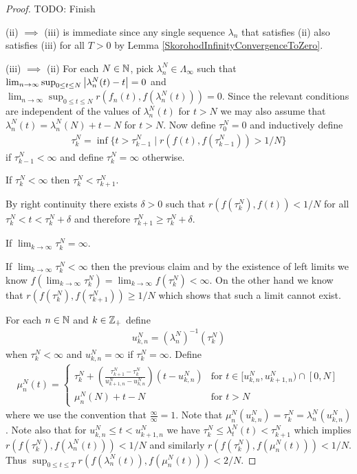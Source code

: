 \begin{proof}
TODO: Finish

(ii) $\implies$ (iii) is immediate since any single sequence $\lambda_n$ that satisfies (ii) also satisfies (iii) for all $T > 0$ by Lemma \ref{SkorohodInfinityConvergenceToZero}.

(iii) $\implies$ (ii)  For each $N \in \mathbb{N}$, pick $\lambda^N_n \in \Lambda_\infty$ such that $\lim_{n \to \infty} \sup_{0 \leq t \leq N} \left \vert \lambda^N_n(t) - t \right \vert = 0$ and $\lim_{n \to \infty} \sup_{0 \leq t \leq N} r(f_n(t), f(\lambda^N_n(t))) = 0$.  Since the relevant conditions are independent of the values of $\lambda^N_n(t)$ for $t > N$ we may also assume that
$\lambda^N_n(t) = \lambda^N_n(N) + t - N$ for $t > N$.  Now define $\tau^N_0 = 0$ and inductively define
\begin{align*}
\tau^N_k = \inf \lbrace t > \tau^N_{k-1} \mid r(f(t), f(\tau^N_{k-1})) > 1/N \rbrace
\end{align*}
if $\tau^N_{k-1} < \infty$ and define $\tau^N_k = \infty$ otherwise.

\begin{clm}If $\tau^N_k < \infty$ then $\tau^N_k < \tau^N_{k+1}$.
\end{clm}
By right continuity there exists $\delta > 0$ such that $r(f(\tau^N_k), f(t)) < 1/N$ for all $\tau^N_k < t < \tau^N_{k} + \delta$ and therefore $\tau^N_{k+1} \geq \tau^N_k + \delta$.

\begin{clm}If $\lim_{k \to \infty} \tau^N_k = \infty$.
\end{clm}
If $\lim_{k \to \infty} \tau^N_k < \infty$ then the previous claim and by the existence of left limits we know $f(\lim_{k \to \infty} \tau^N_k) = \lim_{k \to \infty} f(\tau^N_k) < \infty$.  On the other hand we know that $r(f(\tau^N_k), f(\tau^N_{k+1})) \geq 1/N$ which shows that such a limit cannot exist.

For each $n \in \mathbb{N}$ and $k \in \mathbb{Z}_+$ define
\begin{align*}
u^N_{k,n} = (\lambda^N_n)^{-1}(\tau^N_k)
\end{align*}
when $\tau^N_k < \infty$ and $u^N_{k,n} = \infty$ if $\tau^N_k = \infty$.  Define
\begin{align*}
\mu^N_n(t) = \begin{cases}
\tau^N_k + \left( \frac{\tau^N_{k+1} - \tau^N_k}{u^N_{k+1,n} - u^N_{k,n}} \right) (t - u^N_{k,n}) & \text{for $t \in [u^N_{k,n}, u^N_{k+1,n}) \cap [0,N]$} \\
\mu^N_n(N) + t - N & \text{for $t > N$}
\end{cases}
\end{align*}
where we use the convention that $\frac{\infty}{\infty} = 1$.  Note that $\mu^N_n(u^N_{k,n}) = \tau^N_k= \lambda^N_n(u^N_{k,n})$.  Note also that for $u^N_{k,n} \leq t < u^N_{k+1,n}$ we have $\tau^N_k \leq \lambda^N_t(t) < \tau^N_{k+1}$ which implies $r(f(\tau^N_k), f(\lambda^N_n(t))) < 1/N$ and similarly $r(f(\tau^N_k), f(\mu^N_n(t))) < 1/N$.  Thus 
$\sup_{0 \leq t \leq T} r(f(\lambda^N_n(t)),  f(\mu^N_n(t))) < 2/N$.


\end{proof}
